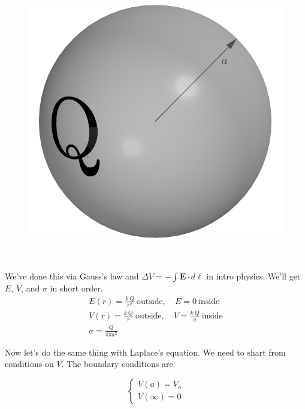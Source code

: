 \documentclass{article}
\begin{document}
\begin{minipage}{0.4\textwidth}
\begin{figure}[H]
\centering
    \includegraphics[width=\textwidth]{figures/6l2.png}
\end{figure}
\end{minipage}
~
\begin{minipage}{0.5\textwidth}
We've done this via Gauss's law and $\displaystyle \Delta V = -\int \bm{E} \cdot d\bm{\ell}$ in intro physics. We'll get $E$, $V$, and $\sigma$ in short order.
\vspace{1em}
\begin{gather*}
    E(r) = \frac{k\ Q}{r^2}\ \text{outside},\quad E = 0\ \text{inside} \\
    V(r) = \frac{k\ Q}{r}\ \text{outside},\quad V = \frac{k\ Q}{a}\ \text{inside} \\
    \sigma = \frac{Q}{4\pi a^2}
\end{gather*}
\end{minipage}

\vspace{1em}

Now let's do the same thing with Laplace's equation. We need to shart from conditions on $V$. The boundary conditions are

\begin{equation*}
    \begin{cases} V(a) = V_o \\[1em] V(\infty) = 0 \end{cases} 
\end{equation*}
\end{document}
